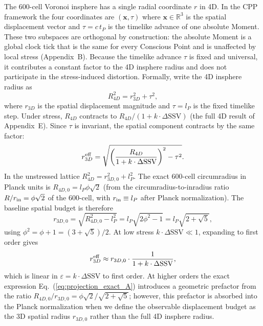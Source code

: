 \documentclass[11pt,letterpaper]{article}
\begin{document}
The 600-cell Voronoi insphere has a single radial coordinate $r$ in 4D. In the CPP framework the four coordinates are $(\mathbf{x}, \tau)$ where $\mathbf{x} \in \mathbb{R}^3$ is the spatial displacement vector and $\tau = c\,t_P$ is the 
timelike advance of one absolute Moment. These two subspaces are orthogonal by construction: the absolute Moment is a global clock tick that is the same for every Conscious Point and is unaffected by local stress (Appendix~B). Because 
the timelike advance $\tau$ is fixed and universal, it contributes a constant factor to the 4D insphere radius and does not participate in the stress-induced distortion. Formally, write the 4D insphere radius as
\begin{equation}
R_{4D}^2 = r_{3D}^2 + \tau^2,
\label{eq:4d_radius_A}
\end{equation}
where $r_{3D}$ is the spatial displacement magnitude and $\tau = l_P$ is the 
fixed timelike step. Under stress, $R_{4D}$ contracts to 
$R_{4D}/(1 + k\cdot\Delta\text{SSV})$ (the full 4D result of Appendix~E). 
Since $\tau$ is invariant, the spatial component contracts by the same factor:
\begin{equation}
r_{3D}^{\rm eff} = \sqrt{\left(\frac{R_{4D}}{1+k\cdot\Delta\text{SSV}}\right)^2 
- \tau^2}.
\label{eq:projection_exact_A}
\end{equation}
In the unstressed lattice $R_{4D}^2 = r_{3D,0}^2 + l_P^2$. The 
exact 600-cell circumradius in Planck units is $R_{4D,0} = 
l_P\phi\sqrt{2}$ (from the circumradius-to-inradius ratio 
$R/r_{\rm in} = \phi\sqrt{2}$ of the 600-cell, with 
$r_{\rm in} \equiv l_P$ after Planck normalization). The baseline 
spatial budget is therefore
\[
r_{3D,0} = \sqrt{R_{4D,0}^2 - l_P^2} = l_P\sqrt{2\phi^2 - 1} 
= l_P\sqrt{2+\sqrt{5}},
\]
using $\phi^2 = \phi + 1 = (3+\sqrt{5})/2$.
At low stress 
$k\cdot\Delta\text{SSV} \ll 1$, expanding to first order gives
\[
r_{3D}^{\rm eff} \approx r_{3D,0} \cdot \frac{1}{1 + k\cdot\Delta\text{SSV}},
\]
which is linear in $\varepsilon = k\cdot\Delta\text{SSV}$ to first 
order. At higher orders the exact expression 
Eq.~(\ref{eq:projection_exact_A}) introduces a geometric prefactor 
from the ratio $R_{4D,0}/r_{3D,0} = \phi\sqrt{2}/\sqrt{2+\sqrt{5}}$; 
however, this prefactor is absorbed into the Planck normalization 
when we define the observable displacement budget as the 3D spatial 
radius $r_{3D,0}$ rather than the full 4D insphere radius. 
\end{document}
